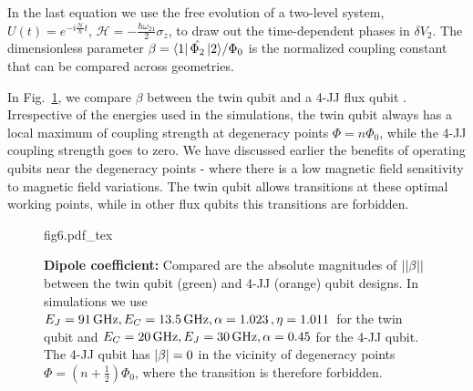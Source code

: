 \noindent  In  the  last   equation  we  use  the  free  evolution   of  a  two-level  system,
$                   U(t)=e^{-i                    \frac{\mathcal{H}}{\hbar}t}                   $,
$  \mathcal{H}  =   -\frac{\hbar\omega_{21}}{2}\sigma_z  $,  to  draw  out  the   time-dependent  phases  in
$\delta  V_2$.   The  dimensionless  parameter  $\beta =  {\Bra{1}\hat{\Phi_2}\Ket{2}}/{\Phi_0}  $  is  the
normalized coupling constant that can be compared across geometries.

In  Fig.~\ref{fig:fig5},  we  compare $\beta$  between  the  twin  qubit  and a  4-JJ  flux  qubit
\cite{honigl2018} .   Irrespective of  the energies  used in the  simulations, the  twin qubit
always has a  local maximum of coupling strength  at degeneracy points $ \Phi =  n\Phi_0$, while the
4-JJ coupling  strength goes  to zero.  We  have discussed earlier  the benefits  of operating
qubits  near the  degeneracy points  - where  there  is a  low magnetic  field sensitivity  to
magnetic field variations.  The twin qubit  allows \ilra {} transitions at these
optimal working points, while in other flux qubits this transitions are forbidden.

\begin{figure}[h]
  \centering\def\svgwidth{8cm}{fig6.pdf_tex}
  \caption{\small \textbf{Dipole  coefficient:} Compared are the absolute magnitudes of $\left|\left|\beta\right|\right|$
    between the twin qubit (green) and 4-JJ (orange) qubit designs. In simulations we use $ E_J =  91\,\text{GHz}, E_C  = 13.5\,\text{GHz}, \alpha  = 1.023\,\text{},  \eta =1.011\,\text{} $ for the twin qubit and
    $ E_{C} = 20\,\text{GHz}, E_J=30\,\text{GHz}, \alpha=0.45 $ for the 4-JJ qubit. The 4-JJ qubit has $\left|\beta\right| = 0$ in the vicinity of degeneracy points $  \Phi =  (n+\frac{1}{2})\Phi_0$, where the transition  \ilra {} is therefore  forbidden.
    \label{fig:fig5}}
\end{figure}


 
